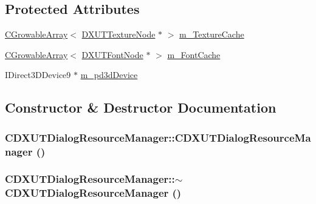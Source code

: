 \subsection*{Protected Attributes}
\begin{DoxyCompactItemize}
\item 
\hyperlink{class_c_growable_array}{CGrowableArray}$<$ \hyperlink{struct_d_x_u_t_texture_node}{DXUTTextureNode} $\ast$ $>$ \hyperlink{class_c_d_x_u_t_dialog_resource_manager_a9a419eb0e0277ed4b211ea698c86404d}{m\_\-TextureCache}
\item 
\hyperlink{class_c_growable_array}{CGrowableArray}$<$ \hyperlink{struct_d_x_u_t_font_node}{DXUTFontNode} $\ast$ $>$ \hyperlink{class_c_d_x_u_t_dialog_resource_manager_a9fb68b8f91a2ac42376a3c00259de62d}{m\_\-FontCache}
\item 
IDirect3DDevice9 $\ast$ \hyperlink{class_c_d_x_u_t_dialog_resource_manager_a8a67a0baff653310af724f8ec0b6f6ad}{m\_\-pd3dDevice}
\end{DoxyCompactItemize}


\subsection{Constructor \& Destructor Documentation}
\hypertarget{class_c_d_x_u_t_dialog_resource_manager_a77adbb5c89ad5d4a74ced5f9bd393f51}{
\subsubsection[{CDXUTDialogResourceManager}]{\setlength{\rightskip}{0pt plus 5cm}CDXUTDialogResourceManager::CDXUTDialogResourceManager ()}}
\label{class_c_d_x_u_t_dialog_resource_manager_a77adbb5c89ad5d4a74ced5f9bd393f51}
\hypertarget{class_c_d_x_u_t_dialog_resource_manager_a0ec400706a20e2e639aef275986fad43}{
\subsubsection[{$\sim$CDXUTDialogResourceManager}]{\setlength{\rightskip}{0pt plus 5cm}CDXUTDialogResourceManager::$\sim$CDXUTDialogResourceManager ()}}
\label{class_c_d_x_u_t_dialog_resource_manager_a0ec400706a20e2e639aef275986fad43}


